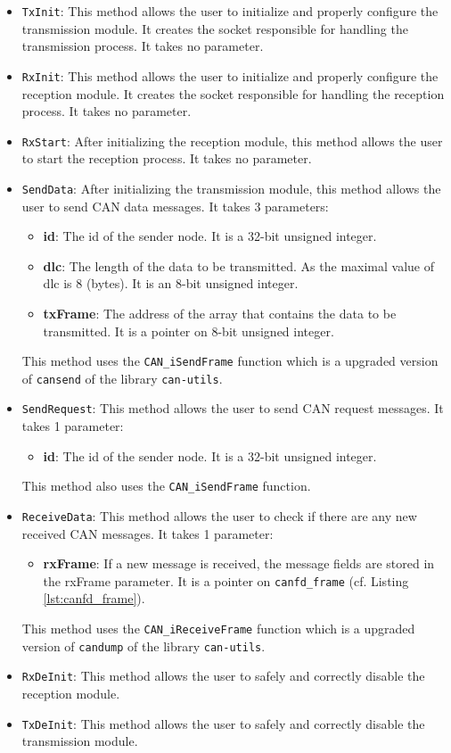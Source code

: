 \begin{itemize}
    \item \verb|TxInit|:
    This method allows the user to initialize and properly configure the transmission module. It creates the socket responsible for handling the transmission process. It takes no parameter.
    \item \verb|RxInit|:
    This method allows the user to initialize and properly configure the reception module. It creates the socket responsible for handling the reception process. It takes no parameter.
    \item \verb|RxStart|:
    After initializing the reception module, this method allows the user to start the reception process. It takes no parameter.
    \item \verb|SendData|: 
    After initializing the transmission module, this method allows the user to send CAN data messages. It takes 3 parameters:
    \begin{itemize}
        \item \textbf{id}: The id of the sender node. It is a 32-bit unsigned integer.
        \item \textbf{dlc}: The length of the data to be transmitted. As the maximal value of dlc is 8 (bytes). It is an 8-bit unsigned integer.
        \item \textbf{txFrame}: The address of the array that contains the data to be transmitted. It is a pointer on 8-bit unsigned integer.
    \end{itemize}
    This method uses the \texttt{CAN\_iSendFrame} function which is a upgraded version of \texttt{cansend} of the library \texttt{can-utils}.

    \item \verb|SendRequest|:
    This method allows the user to send CAN request messages. It takes 1 parameter:
    \begin{itemize}
        \item \textbf{id}: The id of the sender node. It is a 32-bit unsigned integer.
    \end{itemize}
    This method also uses the \texttt{CAN\_iSendFrame} function.
    
    \item \verb|ReceiveData|:
    This method allows the user to check if there are any new received CAN messages. It takes 1 parameter:
    \begin{itemize}
        \item \textbf{rxFrame}: If a new message is received, the message fields are stored in the rxFrame parameter. It is a pointer on \texttt{canfd\_frame} (cf. Listing \ref{lst:canfd_frame}).
    \end{itemize}
    This method uses the \texttt{CAN\_iReceiveFrame} function which is a upgraded version of \texttt{candump} of the library \texttt{can-utils}.
    
   \item \verb|RxDeInit|:
   This method allows the user to safely and correctly disable the reception module. 
   \item \verb|TxDeInit|:
   This method allows the user to safely and correctly disable the transmission module. 
\end{itemize}

